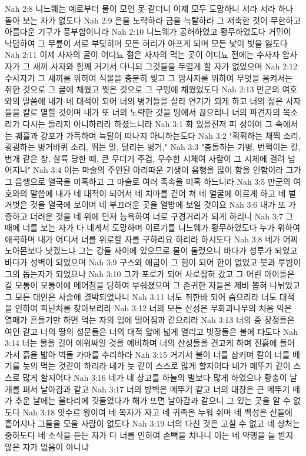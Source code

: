 Nah 2:8  니느웨는 예로부터 물이 모인 못 같더니 이제 모두 도망하니 서라 서라 하나 돌아 보는 자가 없도다
Nah 2:9  은을 노략하라 금을 늑탈하라 그 저축한 것이 무한하고 아름다운 기구가 풍부함이니라
Nah 2:10  니느웨가 공허하였고 황무하였도다 거민이 낙담하여 그 무릎이 서로 부딪히며 모든 허리가 아프게 되며 모든 낯이 빛을 잃도다
Nah 2:11  이제 사자의 굴이 어디뇨 젊은 사자의 먹는 곳이 어디뇨 전에는 수사자 암사자가 그 새끼 사자와 함께 거기서 다니되 그것들을 두렵게 할 자가 없었으며
Nah 2:12  수사자가 그 새끼를 위하여 식물을 충분히 찢고 그 암사자를 위하여 무엇을 움켜서는 취한 것으로 그 굴에 채웠고 찢은 것으로 그 구멍에 채웠었도다
Nah 2:13  만군의 여호와의 말씀에 내가 네 대적이 되어 너의 병거들을 살라 연기가 되게 하고 너의 젊은 사자들을 칼로 멸할 것이며 내가 또 너의 노략한 것을 땅에서 끊으리니 너의 파견자의 목소리가 다시는 들리지 아니하리라 하셨느니라
Nah 3:1  화 있을진저 피 성이여 그 속에서는 궤휼과 강포가 가득하며 늑탈이 떠나지 아니하는도다
Nah 3:2  "휙휙하는 채찍 소리, 굉굉하는 병거바퀴 소리, 뛰는 말, 달리는 병거,"
Nah 3:3  "충돌하는 기병, 번쩍이는 칼, 번개 같은 창, 살륙 당한 떼, 큰 무더기 주검, 무수한 시체여 사람이 그 시체에 걸려 넘어지니"
Nah 3:4  이는 마술의 주인된 아리따운 기생이 음행을 많이 함을 인함이라 그가 그 음행으로 열국을 미혹하고 그 마술로 여러 족속을 미혹 하느니라
Nah 3:5  만군의 여호와의 말씀에 내가 네 대적이 되어서 네 치마를 걷어 쳐 네 얼굴에 이르게 하고 네 벌거벗은 것을 열국에 보이며 네 부끄러운 곳을 열방에 보일 것이요
Nah 3:6  내가 또 가증하고 더러운 것을 네 위에 던져 능욕하여 너로 구경거리가 되게 하리니
Nah 3:7  그 때에 너를 보는 자가 다 네게서 도망하며 이르기를 니느웨가 황무하였도다 누가 위하여 애곡하며 내가 어디서 너를 위로할 자를 구하리요 하리라 하시도다
Nah 3:8  네가 어찌 노아몬보다 낫겠느냐 그는 강들 사이에 있으므로 물이 둘렸으니 바다가 성루가 되었고 바다가 성벽이 되었으며
Nah 3:9  구스와 애굽이 그 힘이 되어 한이 없었고 붓과 루빔이 그의 돕는자가 되었으나
Nah 3:10  그가 포로가 되어 사로잡혀 갔고 그 어린 아이들은 길 모퉁이 모퉁이에 메어침을 당하여 부숴졌으며 그 존귀한 자들은 제비 뽑혀 나뉘었고 그 모든 대인은 사슬에 결박되었나니
Nah 3:11  너도 취한바 되어 숨으리라 너도 대적을 인하여 피난처를 찾아보리라
Nah 3:12  너의 모든 산성은 무화과나무의 처음 익은 열매가 흔들기만 하면 먹는 자의 입에 떨어짐과 같으리라
Nah 3:13  너의 중 장정들은 여인 같고 너의 땅의 성문들은 너의 대적 앞에 넓게 열리고 빗장들은 불에 타도다
Nah 3:14  너는 물을 길어 에워싸일 것을 예비하며 너의 산성들을 견고케 하며 진흙에 들어가서 흙을 밟아 벽돌 가마를 수리하라
Nah 3:15  거기서 불이 너를 삼키며 칼이 너를 베기를 늣의 먹는 것같이 하리라 네가 늣 같이 스스로 많게 할지어다 네가 메뚜기 같이 스스로 많게 할지어다
Nah 3:16  네가 네 상고를 하늘의 별보다 많게 하였으나 황충이 날개를 펴서 날아감과 같고
Nah 3:17  너의 방백은 메뚜기 같고 너의 대장은 큰 메뚜기 떼가 추운 날에는 울타리에 깃들였다가 해가 뜨면 날아감과 같으니 그 있는 곳을 알 수 없도다
Nah 3:18  앗수르 왕이여 네 목자가 자고 네 귀족은 누워 쉬며 네 백성은 산들에 흩어지나 그들을 모을 사람이 없도다
Nah 3:19  너의 다친 것은 고칠 수 없고 네 상처는 중하도다 네 소식을 듣는 자가 다 너를 인하여 손뼉을 치나니 이는 네 약행을 늘 받지 않은 자가 없음이 아니냐


